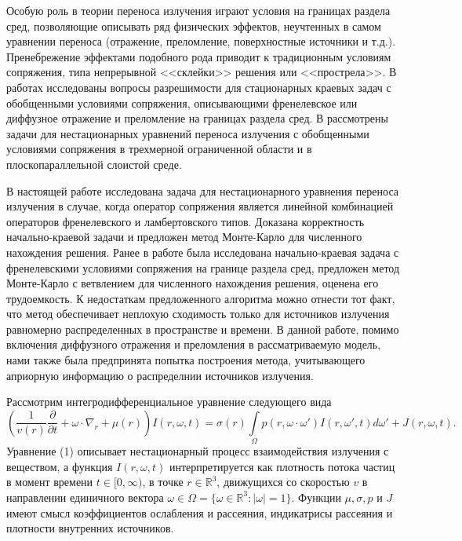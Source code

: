 \documentclass[12pt,reqno]{report}
\begin{document}
Особую роль в теории переноса излучения играют  условия на границах раздела сред, позволяющие описывать ряд физических эффектов, неучтенных в самом уравнении переноса (отражение, преломление, поверхностные источники  и т.д.). Пренебрежение эффектами подобного рода приводит к традиционным условиям сопряжения, типа непрерывной <<склейки>> решения или <<прострела>>\cite{2,6}. В работах \cite{19,20,21,22,23,24,25,26} исследованы  вопросы разрешимости для стационарных краевых задач с обобщенными условиями сопряжения, описывающими  френелевское или диффузное отражение и преломление на границах раздела сред. В \cite{27,28,29,30,31,32,33} рассмотрены  задачи для нестационарных уравнений переноса излучения  с обобщенными  условиями сопряжения в трехмерной ограниченной области и в плоскопараллельной слоистой среде. 

В настоящей работе исследована задача для  нестационарного уравнения переноса излучения в случае, когда оператор сопряжения является линейной комбинацией операторов френелевского и ламбертовского типов. Доказана корректность начально-краевой задачи и предложен метод Монте-Карло для численного  нахождения решения. Ранее в работе \cite{33} была  исследована начально-краевая задача с френелевскими условиями сопряжения на границе раздела сред, предложен метод Монте-Карло  с ветвлением для численного нахождения решения, оценена его трудоемкость. К недостаткам предложенного алгоритма можно отнести  тот факт, что метод обеспечивает неплохую  сходимость только для источников излучения равномерно распределенных в пространстве и времени. В данной работе, помимо включения диффузного отражения и преломления в рассматриваемую модель, нами также была предпринята попытка построения метода, учитывающего априорную информацию о распределнии источников излучения.

Рассмотрим интегродифференциальное уравнение следующего
вида \cite{29,30,31,32,33}
\begin{equation}
\left (\frac{1}{v(r)} \frac{\partial }{\partial t } + \omega
\cdot \nabla_r + \mu(r) \right) I(r,\omega,t)=\sigma(r)
\int\limits_{\Omega} p(r,\omega \cdot
\omega')I(r,\omega',t)d\omega' + J(r,\omega,t).
\end{equation}
Уравнение (1) описывает нестационарный процесс взаимодействия
излучения с веществом, а функция $I(r,\omega,t)$ интерпретируется
как плотность потока частиц в момент времени $t\in [0,\infty)$,
в точке $r\in \mathbb{R}^3$, движущихся со скоростью $v$ в
направлении единичного вектора $\omega \in \Omega=\{\omega \in
\mathbb{R}^3: |\omega|=1\}$. Функции $\mu,\sigma, p$ и $J$ имеют
смысл коэффициентов ослабления и рассеяния,
индикатрисы рассеяния и плотности внутренних источников.
\end{document}

